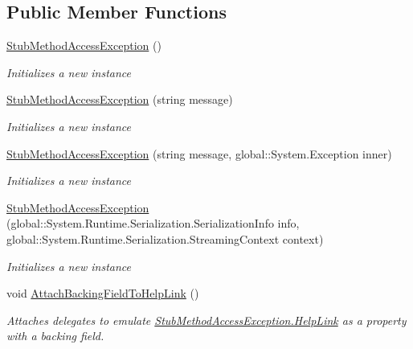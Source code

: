 \subsection*{Public Member Functions}
\begin{DoxyCompactItemize}
\item 
\hyperlink{class_system_1_1_fakes_1_1_stub_method_access_exception_a5339161a52688a2344e4673dfd1940e9}{Stub\-Method\-Access\-Exception} ()
\begin{DoxyCompactList}\small\item\em Initializes a new instance\end{DoxyCompactList}\item 
\hyperlink{class_system_1_1_fakes_1_1_stub_method_access_exception_a974cfdd924711d77cc35ff3efc74def0}{Stub\-Method\-Access\-Exception} (string message)
\begin{DoxyCompactList}\small\item\em Initializes a new instance\end{DoxyCompactList}\item 
\hyperlink{class_system_1_1_fakes_1_1_stub_method_access_exception_a4c63983071b84ce1733cec1bb25ea5e1}{Stub\-Method\-Access\-Exception} (string message, global\-::\-System.\-Exception inner)
\begin{DoxyCompactList}\small\item\em Initializes a new instance\end{DoxyCompactList}\item 
\hyperlink{class_system_1_1_fakes_1_1_stub_method_access_exception_a1502fce6e23213c169c71fa0f7f0545b}{Stub\-Method\-Access\-Exception} (global\-::\-System.\-Runtime.\-Serialization.\-Serialization\-Info info, global\-::\-System.\-Runtime.\-Serialization.\-Streaming\-Context context)
\begin{DoxyCompactList}\small\item\em Initializes a new instance\end{DoxyCompactList}\item 
void \hyperlink{class_system_1_1_fakes_1_1_stub_method_access_exception_aace62ac3e1354bbd86e22cb3b785c9fe}{Attach\-Backing\-Field\-To\-Help\-Link} ()
\begin{DoxyCompactList}\small\item\em Attaches delegates to emulate \hyperlink{class_system_1_1_fakes_1_1_stub_method_access_exception_a72436783a398233a99ed87cbbe02a4d9}{Stub\-Method\-Access\-Exception.\-Help\-Link} as a property with a backing field.\end{DoxyCompactList}\item 

\end{DoxyCompactItemize}
